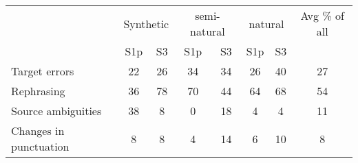 \begin{tabular}{lccccccc}
& \multicolumn{2}{c}{Synthetic} & \multicolumn{2}{c}{semi-natural} & \multicolumn{2}{c}{natural} & Avg \% of all \\
& S1p & S3 & S1p & S3 & S1p & S3 & \\\hline
Target errors & 22 & 26 & 34 & 34 & 26 & 40 & 27\\
Rephrasing & 36 & 78 & 70 & 44 & 64 & 68 & 54\\
Source ambiguities & 38 & 8 & 0 & 18 & 4 & 4 & 11\\
Changes in punctuation & 8 & 8 & 4 & 14 & 6 & 10 & 8\\
\end{tabular}


% 
% 
